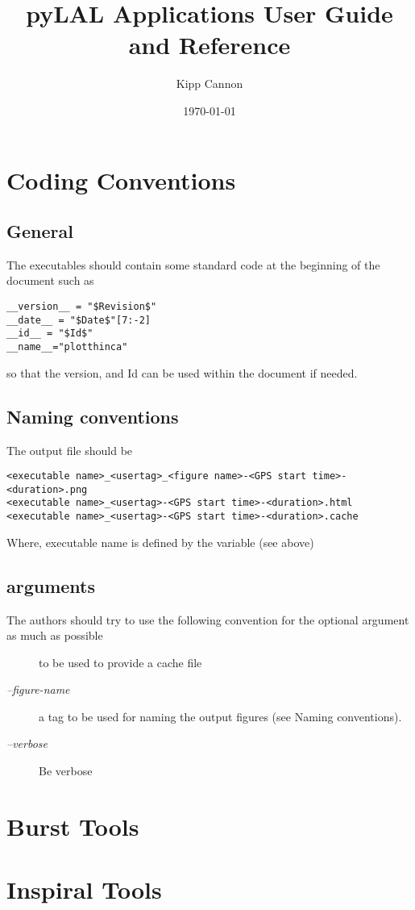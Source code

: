 \documentclass{book}
\title{pyLAL Applications User Guide and Reference}
\author{Kipp Cannon}
\date{\today}
\begin{document}
\maketitle
\tableofcontents
\listoftables
\listoffigures
\chapter{Coding Conventions}
\section{General}
The executables should contain some standard code at the beginning of the document such
as
\begin{verbatim}
__version__ = "$Revision$"
__date__ = "$Date$"[7:-2]
__id__ = "$Id$"
__name__="plotthinca"
\end{verbatim}
so that the version, and Id can be used within the document if needed.

\section{Naming conventions}
The output file should be 

\begin{verbatim}
<executable name>_<usertag>_<figure name>-<GPS start time>-<duration>.png
<executable name>_<usertag>-<GPS start time>-<duration>.html
<executable name>_<usertag>-<GPS start time>-<duration>.cache
\end{verbatim}

Where, executable name is defined by the variable  (see above)




\section{arguments}
The authors should try to use the following convention for the optional
argument as much as possible
\begin{description}
\item[] to be used to provide a cache file
\item[\textit{--figure-name}] a tag to be used for naming the output figures
(see Naming conventions).
\item[\textit{--verbose}] Be verbose


\end{description}

\chapter{Burst Tools}

\chapter{Inspiral Tools}

\end{document}
